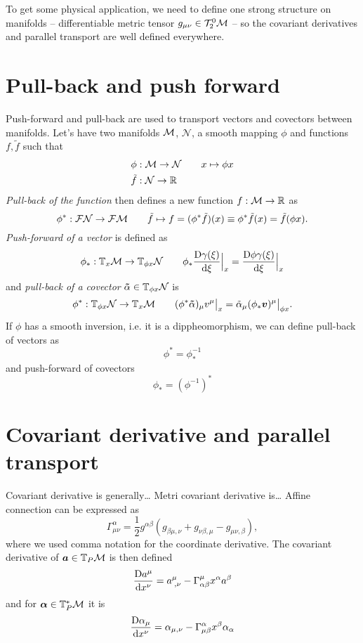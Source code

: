 To get some physical application, we need to define one strong structure on manifolds -- differentiable metric tensor $g_{\mu\nu}\in\mathcal{T}^0_2\mathcal{M}$ -- so the covariant derivatives and parallel transport are well defined everywhere. 


\section{Pull-back and push forward}
Push-forward and pull-back are used to transport vectors and covectors between manifolds. Let's have two manifolds $\mathcal{M}$, $\mathcal{N}$, a smooth mapping $\phi$ and functions $f,\tilde f$ such that
\begin{align*}
    \phi&:\mathcal{M}\rightarrow \mathcal{N}\qquad x\mapsto \phi x\\
    \tilde f&:\mathcal{N}\rightarrow \mathbb{R} 
\end{align*}
\emph{Pull-back of the function} then defines a new function $
f:\mathcal{M}\rightarrow \mathbb{R} $ as
$$\phi^*:\mathcal{F} \mathcal{N}\rightarrow \mathcal{F}\mathcal{M} \qquad  \tilde f\mapsto f=(\phi^*\tilde f)(x)\equiv \phi^*\tilde f(x) =\tilde f(\phi x).$$
\emph{Push-forward of a vector} is defined as
$$\phi_*: \mathbb{T}_x\mathcal{M} \rightarrow \mathbb{T}_{\phi x}\mathcal N\qquad \phi_* 
\frac{\mathrm{D} \gamma(\xi)}{\mathrm{d} \xi}\Big|_x=\frac{\mathrm{D} \phi \gamma(\xi)}{\mathrm{d} \xi}\Big|_x$$
and \emph{pull-back of a covector} $\bm\tilde\alpha\in \mathbb{T}_{\phi x}\mathcal N$ is
$$\phi^*: \mathbb{T}_{\phi x}\mathcal N\rightarrow \mathbb{T}_x\mathcal{M}  \qquad (\phi^*\bm \tilde\alpha)_\mu v^\mu\big|_x= \tilde\alpha_\mu (\phi_* \bm v)^\mu\big|_{\phi x}.$$
If $\phi$ has a smooth inversion, i.e. it is a dippheomorphism, we can define pull-back of vectors as
\begin{equation}
    \phi^*=\phi_*^{-1}
\end{equation}
and push-forward of covectors
\begin{equation}
    \phi_*=(\phi^{-1})^*
\end{equation}

\section{Covariant derivative and parallel transport}
Covariant derivative is generally\dots
Metri covariant derivative is\dots
Affine connection can be expressed as
\begin{equation}
    \Gamma^{\alpha}_{\mu\nu} = \frac{1}{2}g^{\alpha \beta}\left(g_{\beta\mu,\nu}+g_{\nu\beta,\mu}-g_{\mu\nu,\beta}\right),
\end{equation}
where we used comma notation for the coordinate derivative.
The covariant derivative of $\bm a\in \mathbb{T}_P\mathcal{M}$ is then defined
\begin{equation}
    \frac{\mathrm{D} a^\mu}{\mathrm{d} x^\nu}=a_{\;,\nu}^\mu-\Gamma^\mu_{\alpha\beta} x^\alpha a^\beta 
\end{equation}
and for $\bm\alpha\in \mathbb{T}_P^*\mathcal{M}$ it is
\begin{equation}
    \frac{\mathrm{D} \alpha_\mu}{\mathrm{d} x^\nu}=\alpha_{\mu,\nu}-\Gamma^\alpha_{\mu\beta}x^\beta \alpha_\alpha 
\end{equation}

